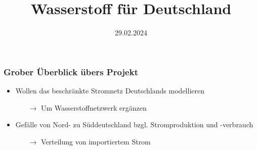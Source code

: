\documentclass[aspectratio=169,t]{beamer}
\title{Wasserstoff für Deutschland}
\subtitle{}
\date{29.02.2024}
\author{}
\begin{document}
	
	\maketitle
	
	
	

	
	\begin{frame}
		\frametitle{Grober Überblick übers Projekt}
		\vspace*{-4mm}
		\begin{minipage}{1\linewidth}
			\begin{minipage}{.5\linewidth}
				
				\vspace*{-12mm}
				
		\begin{itemize}
			\item Wollen das beschränkte Stromnetz Deutschlands modellieren
			\vspace*{2mm}
			
			\begin{itemize}
				\item [$\rightarrow$] Um Wasserstoffnetzwerk ergänzen
			\end{itemize}
		\vspace*{2mm}
		
		\item Gefälle von Nord- zu Süddeutschland bzgl. Stromproduktion und -verbrauch
		\vspace*{2mm}
		
		\begin{itemize}
			\item [$\rightarrow$] Verteilung von importiertem Strom
		\end{itemize}
				 

\end{itemize}
\end{minipage}
\end{minipage}
\end{frame}
\end{document}
